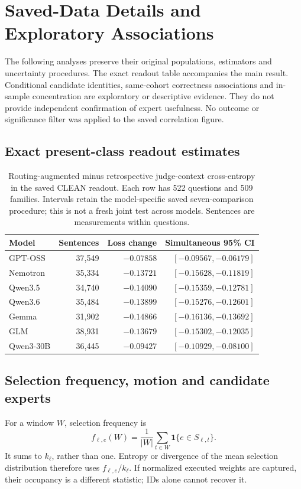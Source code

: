 \section{Saved-Data Details and Exploratory Associations}
\label{sec:saved-data-supplement}

The following analyses preserve their original populations, estimators and
uncertainty procedures. The exact readout table accompanies the main result.
Conditional candidate identities, same-cohort correctness associations and
in-sample concentration are exploratory or descriptive evidence. They do
not provide independent confirmation of expert usefulness. No outcome or
significance filter was applied to the saved correlation figure.

\subsection{Exact present-class readout estimates}

\begin{table}[t]
\centering\small
\begin{tabular}{lrrr}
\toprule
Model & Sentences & Loss change & Simultaneous 95\% CI \\
\midrule
GPT-OSS & 37,549 & $-0.07858$ & $[-0.09567,-0.06179]$ \\
Nemotron & 35,334 & $-0.13721$ & $[-0.15628,-0.11819]$ \\
Qwen3.5 & 34,740 & $-0.14090$ & $[-0.15359,-0.12781]$ \\
Qwen3.6 & 35,484 & $-0.13899$ & $[-0.15276,-0.12601]$ \\
Gemma & 31,902 & $-0.14866$ & $[-0.16136,-0.13692]$ \\
GLM & 38,931 & $-0.13679$ & $[-0.15302,-0.12035]$ \\
Qwen3-30B & 36,445 & $-0.09427$ & $[-0.10929,-0.08100]$ \\
\bottomrule
\end{tabular}
\caption{Routing-augmented minus retrospective judge-context
cross-entropy in the saved CLEAN readout. Each row has 522 questions and
509 families. Intervals retain the model-specific saved seven-comparison
procedure; this is not a fresh joint test across models. Sentences are
measurements within questions.}
\label{tab:analysis-readout}
\end{table}

\subsection{Selection frequency, motion and candidate experts}
For a window $W$, selection frequency is
\begin{equation}
f_{\ell,e}(W)=\frac{1}{|W|}\sum_{t\in W}
             \mathbf{1}\{e\in S_{\ell,t}\}.
\end{equation}
It sums to $k_\ell$, rather than one. Entropy or divergence of the mean
selection distribution therefore uses $f_{\ell,e}/k_\ell$.
If normalized executed weights are captured, their occupancy is a
different statistic; IDs alone cannot recover it.

